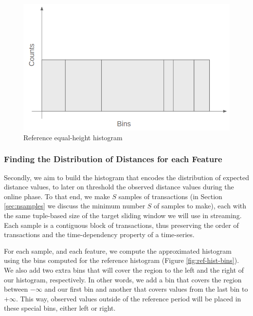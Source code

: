 \begin{figure}[!htb]
    \begin{center}
      \includegraphics[scale=0.4]{figures/ref-hist.png}
      \caption[]{Reference equal-height histogram}
      \label{fig:ref-hist}
    \end{center}
\end{figure}


\subsubsection*{Finding the Distribution of Distances for each Feature} \label{sec:sampling-batch}

Secondly, we aim to build the histogram that encodes the distribution of expected distance values, to later on threshold the observed distance values during the online phase. To that end, we make $S$ samples of transactions (in Section \ref{sec:nsamples} we discuss the minimum number $S$ of samples to make), each with the same tuple-based size of the target sliding window we will use in streaming. Each sample is a contiguous block of transactions, thus preserving the order of transactions and the time-dependency property of a time-series. 

For each sample, and each feature, we compute the approximated histogram using the bins computed for the reference histogram (Figure \ref{fig:ref-hist-bins}). We also add two extra bins that will cover the region to the left and the right of our histogram, respectively. In other words, we add a bin that covers the region between $-\infty$ and our first bin and another that covers values from the last bin to $+\infty$. This way, observed values outside of the reference period will be placed in these special bins, either left or right.

